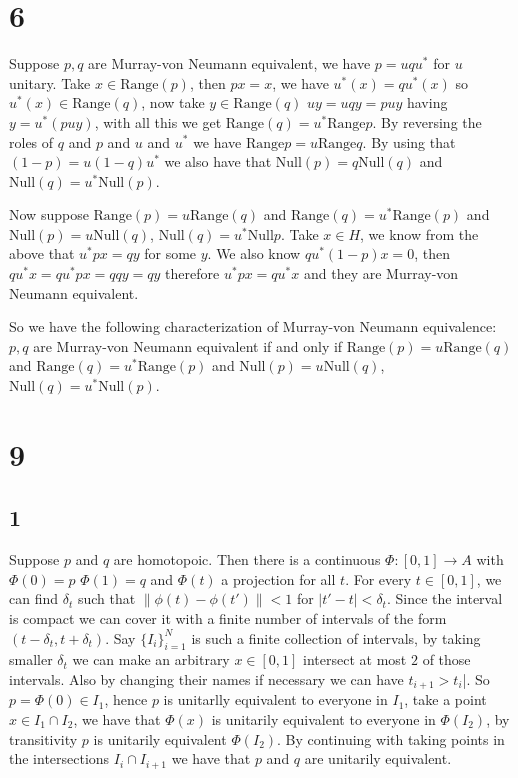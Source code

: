\documentclass{article}
\begin{document}
\section*{6}

Suppose $p,q$ are Murray-von Neumann equivalent, we have $p=uqu^\ast$ for $u$ unitary. Take $x\in\text{Range}(p)$, then $px=x$,
we have $u^\ast(x)=qu^\ast(x)$ so $u^\ast(x)\in \text{Range}(q)$, now take $y\in \text{Range}(q)$ 
$uy=uqy=puy$ having $y=u^\ast(puy)$, with all this we get $\text{Range}(q)=u^\ast \text{Range}p$.
By reversing the roles of $q$ and $p$ and $u$ and $u^\ast$ we have $\text{Range}p=
u\text{Range}q$. By using that $(1-p)=u(1-q)u^\ast$ we also have that $\text{Null} (p)=q\text{Null}(q)$
and $\text{Null}(q)=u^\ast\text{Null}(p)$. 


Now suppose $\text{Range}(p)=u\text{Range}(q)$ and $\text{Range}(q)=u^\ast \text{Range}(p)$ 
and $\text{Null}(p)=u\text{Null}(q)$, $\text{Null}(q)=u^\ast\text{Null}{p}$.
Take $x\in H$, we know from the above that $u^\ast px=qy$ for some $y$. We also know 
$qu^\ast(1-p)x=0$, then $qu^\ast x=qu^\ast px=qqy=qy$ therefore $u^\ast px=qu^\ast x$ and they 
are Murray-von Neumann equivalent.


So we have the following characterization of Murray-von Neumann equivalence: $p,q$ are 
Murray-von Neumann equivalent if and only if $\text{Range}(p)=u\text{Range}(q)$ and $\text{Range}(q)=u^\ast \text{Range}(p)$ 
and $\text{Null}(p)=u\text{Null}(q)$, $\text{Null}(q)=u^\ast\text{Null}(p)$.



\section*{9}
\subsection*{1}
Suppose $p$ and $q$ are homotopoic. Then there is a continuous $\Phi:[0,1]\to A$ with $\Phi(0)=p$
$\Phi(1)=q$ and $\Phi(t)$ a projection for all $t$. For every $t\in [0,1]$, we can find $\delta_t$
such that $\|\phi(t)-\phi(t')\|<1$ for $|t'-t|<\delta_t$. Since the interval is compact
we can cover it with a finite number of intervals of the form $(t-\delta_t,t+\delta_t)$. 
Say $\{I_i\}_{i=1}^{N}$ is such a finite collection of intervals, by taking smaller $\delta_t$
we can make an arbitrary $x\in [0,1]$ intersect at most $2$ of those intervals. Also by
changing their names if necessary we can have $t_{i+1}>t_i$|. So $p=\Phi(0)\in I_1$, hence
$p$ is unitarlly equivalent to everyone in $I_1$, take a point $x\in I_1\cap I_2$, we have 
that $\Phi(x)$ is unitarily equivalent to everyone in $\Phi(I_2)$, by transitivity $p$ is 
unitarily equivalent $\Phi(I_2)$. By continuing with taking points in the intersections 
$I_i\cap I_{i+1}$ we have that $p$ and $q$ are unitarily equivalent.  
\end{document}
